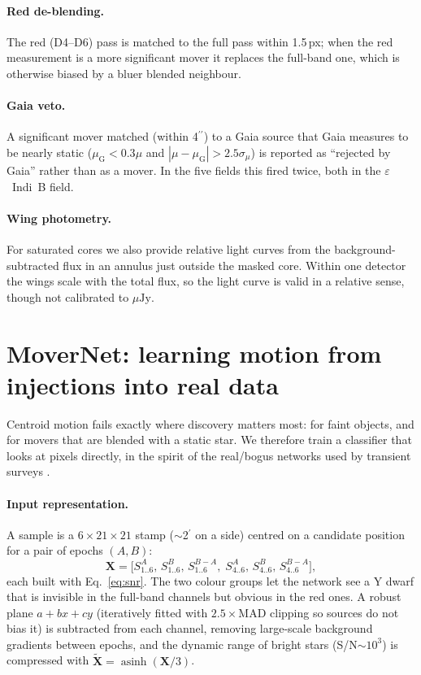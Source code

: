 \documentclass[10pt,twocolumn]{article}
\newcommand{\asec}{\ensuremath{^{\prime\prime}}}
\newcommand{\amin}{\ensuremath{^{\prime}}}
\newcommand{\uJy}{\ensuremath{\mu\mathrm{Jy}}}
\newcommand{\SN}{S/N}
\newcommand{\epsIndiB}{$\varepsilon$~Indi~B}
\begin{document}
\paragraph{Red de-blending.} The red (D4--D6) pass is matched to the full pass within 1.5\,px; when the
red measurement is a more significant mover it replaces the full-band one, which is otherwise biased by a
bluer blended neighbour.

\paragraph{Gaia veto.} A significant mover matched (within 4\asec) to a Gaia source that Gaia measures to be
nearly static ($\mu_\mathrm{G}<0.3\mu$ and $|\mu-\mu_\mathrm{G}|>2.5\sigma_\mu$) is reported as
``rejected by Gaia'' rather than as a mover. In the five fields this fired twice, both in the \epsIndiB{}
field.

\paragraph{Wing photometry.} For saturated cores we also provide relative light curves from the
background-subtracted flux in an annulus just outside the masked core. Within one detector the wings scale
with the total flux, so the light curve is valid in a relative sense, though not calibrated to \uJy.

\section{MoverNet: learning motion from injections into real data}
\label{sec:cnn}

Centroid motion fails exactly where discovery matters most: for faint objects, and for movers that
are blended with a static star. We therefore train a classifier that looks at pixels directly, in the
spirit of the real/bogus networks used by transient surveys \citep{duev2019}.

\paragraph{Input representation.} A sample is a $6\times21\times21$ stamp ($\sim$2\amin{} on a side)
centred on a candidate position for a pair of epochs $(A,B)$:
\begin{equation}
  \mathbf X = \big[S^A_{1..6},\,S^B_{1..6},\,S^{B-A}_{1..6},\;
                   S^A_{4..6},\,S^B_{4..6},\,S^{B-A}_{4..6}\big],
\end{equation}
each built with Eq.~\eqref{eq:snr}. The two colour groups let the network see a Y dwarf that is invisible
in the full-band channels but obvious in the red ones. A robust plane $a+bx+cy$ (iteratively fitted with
$2.5\times$MAD clipping so sources do not bias it) is subtracted from each channel, removing large-scale
background gradients between epochs, and the dynamic range of bright stars (\SN{}$\sim10^3$) is
compressed with $\tilde{\mathbf X}=\operatorname{asinh}(\mathbf X/3)$.
\end{document}
